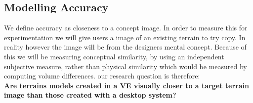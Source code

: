 \documentclass{sig-alternate-05-2015}
\begin{document}
\subsection{Modelling Accuracy}
We define accuracy as closeness to a concept image. In order to measure this for experimentation we will give users a image of an existing terrain to try copy. In reality however the image will be from the designers mental concept. Because of this we will be measuring conceptual similarity, by using an independent subjective measure, rather than physical similarity which would be measured by computing volume differences. our research question is therefore:\\
\textbf{Are terrains models created in a VE visually closer to a target terrain image than those created with a desktop system?}\\
\newpage
\end{document}
